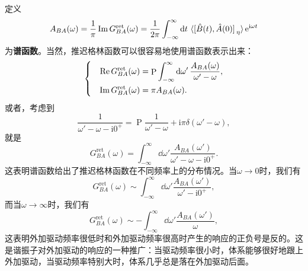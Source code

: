 \documentclass[hyperref, UTF8, a4paper]{ctexart}
\DeclareMathOperator{\primevalue}{P}
\newcommand*{\ii}{\mathrm{i}}
\newcommand*{\ee}{\mathrm{e}}
\newenvironment{bigcase}{\left\{\quad\begin{aligned}}{\end{aligned}\right.}
\begin{document}
定义%
\begin{equation}
    A_{BA}(\omega) = \frac{1}{\pi} \Im G_{BA}^\text{ret}(\omega) = \frac{1}{2 \pi} \int_{-\infty}^\infty \dd{t} \expval*{\comm*{\hat{B}(t)}{\hat{A}(0)}_\eta} \ee^{\ii \omega t}
\end{equation}
为\textbf{谱函数}。当然，推迟格林函数可以很容易地使用谱函数表示出来：%
\begin{equation}
    \begin{bigcase}
        \Re G_{BA}^\text{ret}(\omega) &= \primevalue \int_{-\infty}^\infty \dd{\omega'} \frac{A_{BA}(\omega)}{\omega'-\omega} , \\
        \Im G_{BA}^\text{ret}(\omega) &= \pi A_{BA}(\omega).
    \end{bigcase}
\end{equation}
或者，考虑到
\[
    \frac{1}{\omega'-\omega-\ii 0^+} = \primevalue \frac{1}{\omega'-\omega} + \ii \pi \delta(\omega'-\omega),
\]
就是
\begin{equation}
    G_{BA}^\text{ret}(\omega) = \int_{-\infty}^\infty \dd{\omega'} \frac{A_{BA}(\omega')}{\omega' - \omega - \ii 0^+}.
\end{equation}
这表明谱函数给出了推迟格林函数在不同频率上的分布情况。当$\omega\to 0$时，我们有
\[
    G_{BA}^\text{ret}(\omega) \sim \int_{-\infty}^\infty \dd{\omega'} \frac{A_{BA}(\omega')}{\omega' - \ii 0^+},
\]
而当$\omega\to \infty$时，我们有
\[
    G_{BA}^\text{ret}(\omega) \sim - \int_{-\infty}^\infty \dd{\omega'} \frac{A_{BA}(\omega')}{\omega},
\]
这表明外加驱动频率很低时和外加驱动频率很高时产生的响应的正负号是反的。这是谐振子对外加驱动的响应的一种推广：当驱动频率很小时，体系能够很好地跟上外加驱动，当驱动频率特别大时，体系几乎总是落在外加驱动后面。
\end{document}

